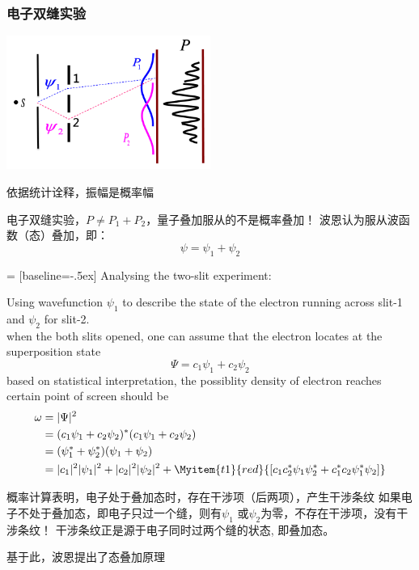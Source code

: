 \begin{frame}
    \frametitle{电子双缝实验}
    \begin{center}
        \includegraphics[width=0.5\textwidth]{figs/sup-3.png} \\
    \end{center} 
    依据统计诠释，振幅是概率幅\\
    \begin{itemize}
        \Item 电子双缝实验，$P\neq P_1+P_2 $，量子叠加服从的不是概率叠加！
        \Item 波恩认为服从波函数（态）叠加，即：
        $$ \psi =\psi_1+\psi_2$$
    \end{itemize}
\end{frame} 


\begin{frame} [allowframebreaks=]
     = [baseline=-.5ex]
    Analysing the two-slit experiment:\\
    \begin{itemize}
        \Item Using wavefunction $\psi_1$ to describe the state of the electron running across slit-1 and $\psi_2$ for slit-2. \\
        \Item when the both slits opened, one can assume that the electron locates at the superposition state
            \[ \Psi=c_1 \psi_1+ c_2\psi_2 \]
        \Item based on statistical interpretation, the possiblity density of electron reaches certain point of screen should be
        \begin{equation*}
        \begin{split}
            \omega &=|\Psi|^2 \\
            &= (c_1 \psi_1+ c_2\psi_2)^* (c_1 \psi_1+ c_2\psi_2) \\
            &=(\psi_1^*+\psi_2^*)(\psi_1+\psi_2) \\ 
            & = |c_1|^2 |\psi_1|^2 + |c_2|^2 |\psi_2|^2  
            + \Myitem{t1}{red}{[c_1 c_2 ^* \psi_1 \psi_2 ^* + c_1 ^* c_2 \psi_1 ^* \psi_2]} \\
        \end{split} 
        \end{equation*}
    \end{itemize}
    \begin{itemize}
        \Item 概率计算表明，电子处于叠加态时，存在干涉项（后两项），产生干涉条纹
        \Item 如果电子不处于叠加态，即电子只过一个缝，则有$\psi_1$ 或$\psi_2$为零，不存在干涉项，没有干涉条纹！
        \Item 干涉条纹正是源于电子同时过两个缝的状态, 即叠加态。
    \end{itemize}
    基于此，波恩提出了态叠加原理
\end{frame}

